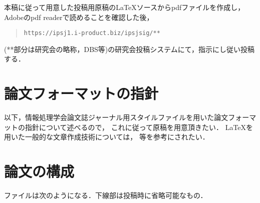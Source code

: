 \documentclass[submit,techrep,noauthor]{ipsj}
\def\|{\verb|}
\begin{document}
本稿に従って用意した投稿用原稿の\LaTeX ソースからpdfファイルを作成し，
Adobeのpdf readerで読めることを確認した後，
\begin{quote}
	\small
	\|https://ipsj1.i-product.biz/ipsjsig/**|
\end{quote}
(**部分は研究会の略称，DBS等)の研究会投稿システムにて，指示にし従い投稿する．

\section{論文フォーマットの指針}
\label{sec:format}

以下，情報処理学会論文誌ジャーナル用スタイルファイルを用いた論文フォーマットの指針について述べるので，
これに従って原稿を用意頂きたい．
\LaTeX を用いた一般的な文章作成技術については，
\cite{okumura, companion} 等を参考にされたい．

\section{論文の構成}
\label{config}

ファイルは次のようになる．下線部は投稿時に省略可能なもの．
\end{document}
